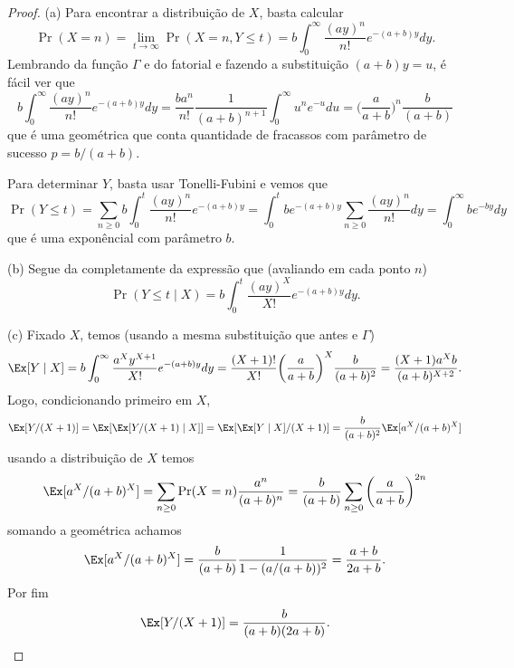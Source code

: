 \begin{proof}
	(a) Para encontrar a distribuição de $X$, basta calcular
	\[
		\Pr(X = n) = \lim_{t \to \infty} \Pr(X = n, Y \leq t) = b
		\int_{0}^\infty \frac{(ay)^n}{n!}e^{-(a+b)y}dy.
	\]
	Lembrando da função $\Gamma$ e do fatorial e fazendo a substituição
	$(a+b)y = u$, é fácil ver que
	\[
		b \int_{0}^\infty \frac{(ay)^n}{n!}e^{-(a+b)y} dy =
		\frac{ba^n}{n!}\frac{1}{(a + b)^{n+1}} \int_0^\infty u^n e^{-u} du
		= \bigg(\frac{a}{a + b}\bigg)^n \frac{b}{(a + b)}
	\]
	que é uma geométrica que conta quantidade de fracassos com parâmetro
	de sucesso $p = b/(a+b)$.

	Para determinar $Y$, basta usar Tonelli-Fubini e vemos que
	\[
		\Pr(Y \leq t) = \sum_{n \geq 0} b\int_0^t
		\frac{(ay)^n}{n!}e^{-(a+b)y} = \int_0^t be^{-(a+b)y} \sum_{n \geq
		0} \frac{(ay)^n}{n!} dy = \int_0^\infty be^{-by}dy
	\]
	que é uma exponêncial com parâmetro $b$.

	(b) Segue da completamente da expressão que (avaliando em cada ponto $n$)
	\[
		\Pr(Y \leq t \mid X) = b\int_0^t \frac{(ay)^X}{X!}e^{-(a+b)y} dy.
	\]

	(c) Fixado $X$, temos (usando a mesma substituição que antes e $\Gamma$)
	\[
		\Ex [Y \mid X] = b\int_0^\infty \frac{a^Xy^{X + 1}}{X!}e^{-(a+b)y}dy =
		\frac{(X+1)!}{X!} \bigg(\frac{a}{a + b}\bigg)^X \frac{b}{(a + b)^2}
		= \frac{(X + 1)a^Xb}{(a+b)^{X + 2}}.
	\]
	Logo, condicionando primeiro em $X$,
	\[
		\Ex[Y/(X+1)] = \Ex[ \Ex[Y/(X+1) \mid X]] = \Ex[ \Ex[Y \mid
		X]/(X+1)] = \frac{b}{(a+b)^2}\Ex[a^X/(a + b)^{X}]
	\]
	usando a distribuição de $X$ temos
	\[
		\Ex[a^X/(a + b)^{X}] = \sum_{n\geq 0} \Pr(X = n)
		\frac{a^n}{(a+b)^n} = \frac{b}{(a + b)} \sum_{n \geq 0}
		\bigg(\frac{a}{a + b}\bigg)^{2n}
	\]
	somando a geométrica achamos
	\[
		\Ex[a^X/(a + b)^{X}] = \frac{b}{(a + b)} \frac{1}{1 - (a/(a+b))^2}
		= \frac{a+b}{2a + b}.
	\]
	Por fim
	\[
		\Ex[Y/(X+1)] = \frac{b}{(a+b)(2a + b)}.
	\]


\end{proof}

